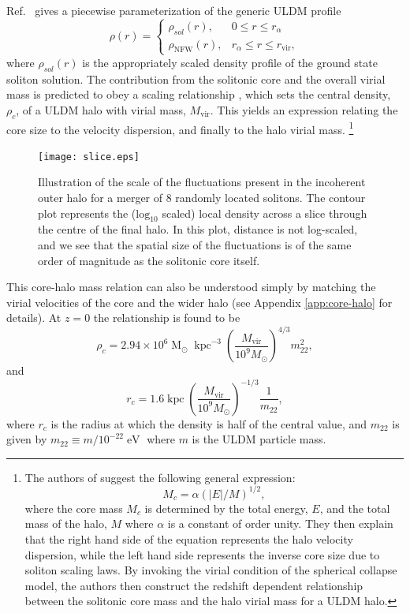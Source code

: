 \documentclass{pasa}%
\begin{document}
 
Ref.~\cite{Robles:2018fur} gives a piecewise parameterization of the generic ULDM profile 
%
\begin{equation}\label{eq:piecewise}
     \rho(r)=
    \begin{cases}
      \rho_{sol}(r), & 0\leq r \leq r_{\alpha} \\
      \rho_\mathrm{NFW}(r), & r_{\alpha}\leq r \leq r_{\mathrm{vir}},
    \end{cases}
\end{equation}
%
where $\rho_{sol}(r)$ is the appropriately scaled density profile of the ground state soliton solution. The contribution from the solitonic core and the overall virial mass is predicted to obey a scaling relationship \cite{Schive:2014hza, Chavanis:2019faf}, which sets the central density, $\rho_c$, of a ULDM halo with virial mass, $M_{\mathrm{vir}}$. This yields an expression relating the core size to the velocity dispersion, and finally to the halo virial mass.%
\footnote{The authors of \cite{Schive:2014hza} suggest the following general expression:
\begin{equation}
    M_c = \alpha \left(\vert E\vert/M\right)^{1/2},
\end{equation}
where the core mass $M_c$ is determined by the total energy, $E$, and the total mass of the halo, $M$ where $\alpha$ is a constant of order unity. They then explain that the right hand side of the equation represents the halo velocity dispersion, while the left hand side  represents the inverse core size due to soliton scaling laws. By invoking the virial condition of the spherical collapse model, the authors then  construct the redshift dependent relationship between the solitonic core mass and the halo virial mass for a ULDM halo.}

\begin{figure}[t]
\centering
\texttt{[image: slice.eps]}
\caption{Illustration of the scale of the fluctuations present in the incoherent outer halo for a merger of 8 randomly located solitons. The contour plot represents the ($\mathrm{log}_{10}$ scaled) local density across a slice through the centre of the final halo. In this plot, distance is not log-scaled, and we see that the spatial size of the fluctuations is of the same order of magnitude as the solitonic core itself.}\label{fig:contour}
\end{figure}
%
This core-halo mass relation can also be understood simply by matching the virial velocities of the core and the wider halo (see Appendix \ref{app:core-halo} for details). 
At $z=0$ the relationship is found to be \cite{Schive:2014hza} 
%
\begin{equation}\label{eq:central_dens}
    \rho_c = 2.94\times10^6 \operatorname{M}_{\odot}\operatorname{kpc}^{-3}\left(\frac{M_{\mathrm{vir}}}{10^9 M_{\odot}}\right)^{4/3}m_{22}^{2},
\end{equation}
and 
\begin{equation}
    r_c = 1.6 \operatorname{kpc}\left(\frac{M_{\mathrm{vir}}}{10^9 M_{\odot}}\right)^{-1/3}\frac{1}{m_{22}},
\end{equation}
%
where $r_c$ is the radius at which the density is half of the central value, and $m_{22}$ is given by $m_{22} \equiv m / 10^{-22} \operatorname{eV}$ where $m$ is the ULDM particle mass. 
\end{document}
